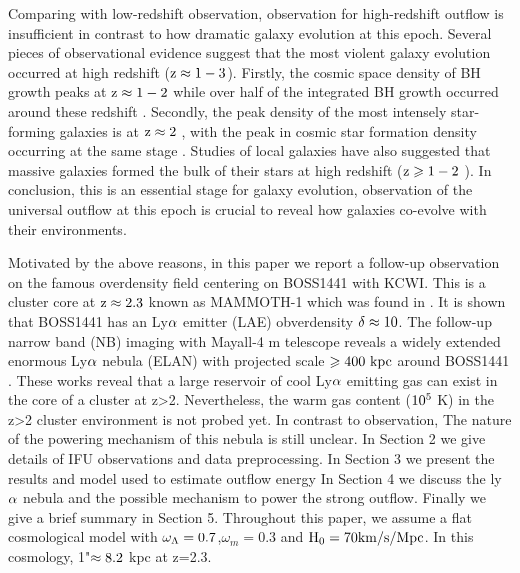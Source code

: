 Comparing with low-redshift observation, observation for high-redshift outflow is insufficient in contrast to how dramatic galaxy evolution at this epoch. Several pieces of observational evidence suggest that the most violent galaxy evolution occurred at high redshift ($\rm z \approx 1-3$). Firstly, the cosmic space density of BH growth peaks at $\rm z \approx 1-2$ while over half of the integrated BH growth occurred around these redshift \citep{schmidt1983quasar,richards2006sloan}. Secondly, the peak density of the most intensely star-forming galaxies is at $\rm z \approx 2$ \citep{chapman2005redshift,wardlow2011laboca}, with the peak in cosmic star formation density occurring at the same stage \citep{madau1996high,lilly1999canada,madau2014cosmic}. Studies of local galaxies have also suggested that massive galaxies formed the bulk of their stars at high redshift ($\rm z \geqslant 1-2$ ). In conclusion, this is an essential stage for galaxy evolution, observation of the universal outflow at this epoch is crucial to reveal how galaxies co-evolve with their environments. 

Motivated by the above reasons, in this paper we report a follow-up observation on the famous overdensity field centering on BOSS1441 with KCWI. This is a cluster core at $\rm z \approx 2.3$ known as MAMMOTH-1 which was found in \citet{cai2017discovery}. It is shown that BOSS1441 has an Ly$\rm \alpha$ emitter (LAE) obverdensity $\rm \delta \approx 10$. The follow-up narrow band (NB) imaging with Mayall-4 m telescope reveals a widely extended enormous Ly$\rm \alpha$ nebula (ELAN) with projected scale $\rm \geqslant 400 \ kpc$ around BOSS1441 \citep{cai2017discovery}. These works reveal that a large reservoir of cool Ly$\rm \alpha$ emitting gas can exist in the core of a cluster at z>2. Nevertheless, the warm gas content ($\rm 10^{5}$ K) in the z>2 cluster environment is not probed yet. In contrast to observation, The nature of the powering mechanism of this nebula is still unclear.
In Section 2 we give details of IFU observations and data preprocessing. In Section 3 we present the results and model used to estimate outflow energy In Section 4 we discuss the ly$\rm \alpha$ nebula and the possible mechanism to power the strong outflow. Finally we give a brief summary in Section 5. Throughout this paper, we assume a flat cosmological model with $\rm \omega_{\Lambda}=0.7$,$\omega_{m}=0.3$ and $\rm H_{0}=70 km/s/Mpc$. In this cosmology, 1"$\rm \approx 8.2$ kpc at z=2.3.


